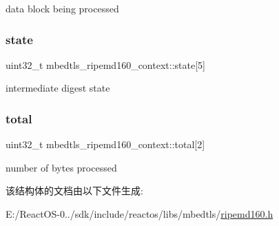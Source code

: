data block being processed \mbox{\label{structmbedtls__ripemd160__context_af56cf97ec4c54ae4bb540422b459782c}} 
\subsubsection{\texorpdfstring{state}{state}}
{\footnotesize\ttfamily uint32\+\_\+t mbedtls\+\_\+ripemd160\+\_\+context\+::state\mbox{[}5\mbox{]}}

intermediate digest state \mbox{\label{structmbedtls__ripemd160__context_afc1ec88d27b692be26d819a752be8d4a}} 
\subsubsection{\texorpdfstring{total}{total}}
{\footnotesize\ttfamily uint32\+\_\+t mbedtls\+\_\+ripemd160\+\_\+context\+::total\mbox{[}2\mbox{]}}

number of bytes processed 

该结构体的文档由以下文件生成\+:\begin{DoxyCompactItemize}
\item 
E\+:/\+React\+O\+S-\/0../sdk/include/reactos/libs/mbedtls/\hyperlink{ripemd160_8h}{ripemd160.\+h}\end{DoxyCompactItemize}
